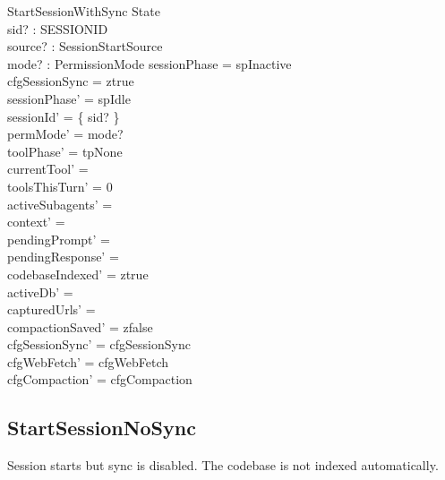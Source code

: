 \documentclass[a4paper,10pt,fleqn]{article}
\begin{document}
\begin{schema}{StartSessionWithSync}
  \Delta State \\
  sid? : SESSIONID \\
  source? : SessionStartSource \\
  mode? : PermissionMode
  \where
  sessionPhase = spInactive \\
  cfgSessionSync = ztrue \\
  sessionPhase' = spIdle \\
  sessionId' = \{ sid? \} \\
  permMode' = mode? \\
  toolPhase' = tpNone \\
  currentTool' = \emptyset \\
  toolsThisTurn' = 0 \\
  activeSubagents' = \emptyset \\
  context' = \langle \rangle \\
  pendingPrompt' = \emptyset \\
  pendingResponse' = \emptyset \\
  codebaseIndexed' = ztrue \\
  activeDb' = \emptyset \\
  capturedUrls' = \emptyset \\
  compactionSaved' = zfalse \\
  cfgSessionSync' = cfgSessionSync \\
  cfgWebFetch' = cfgWebFetch \\
  cfgCompaction' = cfgCompaction
\end{schema}

\subsection{StartSessionNoSync}

Session starts but sync is disabled. The codebase is not indexed
automatically.
\end{document}
